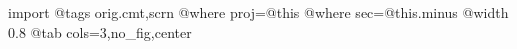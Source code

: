  
 
 
 
 

\qqSecCmtScr

\ifcmt
  import
  @tags orig.cmt,scrn
  @where proj=@this
  @where sec=@this.minus
  @width 0.8
  @tab cols=3,no_fig,center
\fi

